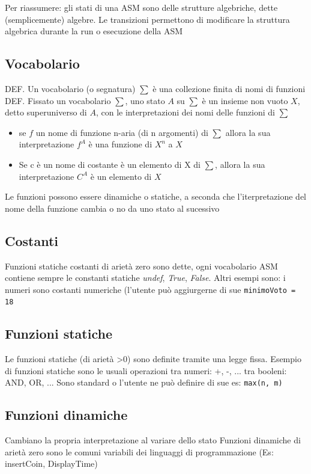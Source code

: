 \documentclass{article}
\begin{document}
Per riassumere: gli stati di una ASM sono delle strutture algebriche, dette (semplicemente) algebre. Le transizioni permettono di modificare la struttura algebrica durante la run o esecuzione della ASM

\subsection*{Vocabolario}

DEF. Un vocabolario (o segnatura) $\sum$ è una collezione finita di nomi di funzioni 
DEF. Fissato un vocabolario $\sum$, uno stato $A$ su $\sum$ è un 
insieme non vuoto $X$, detto superuniverso di $A$, con 
le interpretazioni dei nomi delle funzioni di $\sum$

\begin{itemize}
   \item se $f$ un nome di funzione n-aria (di n argomenti) di $\sum$ allora la sua interpretazione $f^A$ è una funzione di $X^n$ a $X$ 
   \item Se c è un nome di costante è un elemento di X di $\sum$, allora la sua interpretazione $C^A$ è un elemento di $X$
\end{itemize}

Le funzioni possono essere dinamiche o statiche, a seconda che l'iterpretazione del nome della funzione cambia o no da uno stato al sucessivo

\subsection*{Costanti}
Funzioni statiche costanti di arietà zero sono dette,  ogni vocabolario ASM contiene sempre le constanti statiche \textit{undef}, \textit{True}, \textit{False}. Altri esempi sono: i numeri sono costanti numeriche (l'utente può aggiurgerne di sue \texttt{minimoVoto = 18}

\subsection*{Funzioni statiche}
Le funzioni statiche (di arietà >0) sono definite tramite una legge fissa. Esempio di funzioni statiche sono le usuali operazioni tra numeri: +, -, ... tra booleni: AND, OR, ... Sono standard o l'utente ne può definire di sue es: \texttt{max(n, m)}

\subsection*{Funzioni dinamiche}
Cambiano la propria interpretazione al variare dello 
stato  Funzioni dinamiche di arietà zero sono le comuni variabili dei linguaggi di programmazione (Es: insertCoin, DisplayTime)
\end{document}

